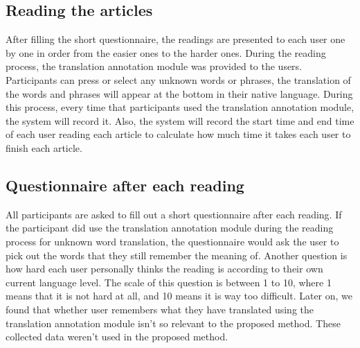 \subsection{Reading the articles}
\vspace{10pt}
After filling the short questionnaire, the readings are presented to each user one by one in order from the easier ones to the harder ones. During the reading process, the translation annotation module was provided to the users. Participants can press or select any unknown words or phrases, the translation of the words and phrases will appear at the bottom in their native language. During this process, every time that participants used the translation annotation module, the system will record it. Also, the system will record the start time and end time of each user reading each article to calculate how much time it takes each user to finish each article.

\subsection{Questionnaire after each reading}
\vspace{10pt}
All participants are asked to fill out a short questionnaire after each reading. If the participant did use the translation annotation module during the reading process for unknown word translation, the questionnaire would ask the user to pick out the words that they still remember the meaning of. Another question is how hard each user personally thinks the reading is according to their own current language level. The scale of this question is between 1 to 10, where 1 means that it is not hard at all, and 10 means it is way too difficult. Later on, we found that whether user remembers what they have translated using the translation annotation module isn't so relevant to the proposed method. These collected data weren't used in the proposed method.

